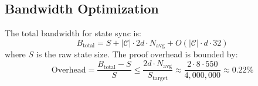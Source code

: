 \subsection{Bandwidth Optimization}

\begin{proposition}
The total bandwidth for state sync is:
\begin{equation}
    B_{\text{total}} = S + |\mathcal{C}| \cdot 2d \cdot N_{\text{avg}} + O(|\mathcal{C}| \cdot d \cdot 32)
\end{equation}
where $S$ is the raw state size. The proof overhead is bounded by:
\begin{equation}
    \text{Overhead} = \frac{B_{\text{total}} - S}{S} \leq \frac{2d \cdot N_{\text{avg}}}{S_{\text{target}}} \approx \frac{2 \cdot 8 \cdot 550}{4{,}000{,}000} \approx 0.22\%
\end{equation}
\end{proposition}

